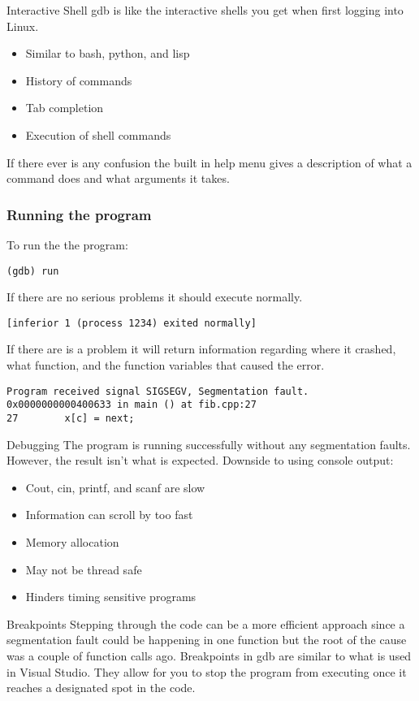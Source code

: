 \documentclass[11pt]{beamer}
\begin{document}
\begin{frame}{Interactive Shell}
gdb is like the interactive shells you get when first logging into Linux.
\begin{itemize}
\item Similar to bash, python, and lisp
\item History of commands
\item Tab completion
\item Execution of shell commands
\end{itemize}
If there ever is any confusion the built in help menu gives a description of what a command does and what arguments it takes.
\end{frame}

\begin{frame}[fragile]
\frametitle{Running the program}
To run the the program:
\begin{lstlisting}[style=BashInputStyle]
(gdb) run
\end{lstlisting}
If there are no serious problems it should execute normally.
\begin{lstlisting}[style=BashInputStyle]
[inferior 1 (process 1234) exited normally]
\end{lstlisting}
If there are is a problem it will return information regarding where it crashed, what function, and the function variables that caused the error.
\begin{lstlisting}[style=BashInputStyle]
Program received signal SIGSEGV, Segmentation fault.
0x0000000000400633 in main () at fib.cpp:27
27        x[c] = next;
\end{lstlisting}
\end{frame}

\begin{frame}{Debugging}
The program is running successfully without any segmentation faults. However, the result isn't what is expected.
\break
\break
Downside to using console output:
\begin{itemize}
\item Cout, cin, printf, and scanf are slow
\item Information can scroll by too fast
\item Memory allocation
\item May not be thread safe
\item Hinders timing sensitive programs
\end{itemize}
\end{frame}
\begin{frame}{Breakpoints}
Stepping through the code can be a more efficient approach since a segmentation fault could be happening in one function but the root of the cause was a couple of function calls ago.
\break
\break
Breakpoints in gdb are similar to what is used in Visual Studio. They allow for you to stop the program from executing once it reaches a designated spot in the code.
\end{frame}
\end{document}
